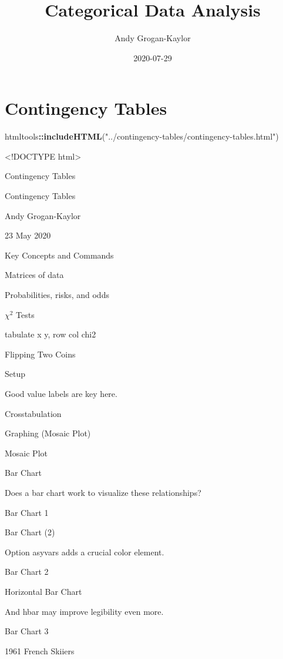 \documentclass[
]{article}
\title{Categorical Data Analysis}
\author{Andy Grogan-Kaylor}
\date{2020-07-29}
\newenvironment{Shaded}{\begin{snugshade}}{\end{snugshade}}
\newcommand{\KeywordTok}[1]{\textcolor[rgb]{0.13,0.29,0.53}{\textbf{#1}}}
\newcommand{\NormalTok}[1]{#1}
\newcommand{\OperatorTok}[1]{\textcolor[rgb]{0.81,0.36,0.00}{\textbf{#1}}}
\newcommand{\StringTok}[1]{\textcolor[rgb]{0.31,0.60,0.02}{#1}}
\begin{document}
\maketitle

{
\setcounter{tocdepth}{2}
\tableofcontents
}
\hypertarget{contingency-tables}{%
\section{Contingency Tables}\label{contingency-tables}}

\begin{Shaded}
\begin{Highlighting}[]
\NormalTok{htmltools}\OperatorTok{::}\KeywordTok{includeHTML}\NormalTok{(}\StringTok{"../contingency-tables/contingency-tables.html"}\NormalTok{)}
\end{Highlighting}
\end{Shaded}

\textless!DOCTYPE html\textgreater{}

Contingency Tables

Contingency Tables

Andy Grogan-Kaylor

23 May 2020

Key Concepts and Commands

Matrices of data

Probabilities, risks, and odds

{\(\chi^2\)} Tests

tabulate x y, row col chi2

Flipping Two Coins

Setup

Good value labels are key here.

Crosstabulation

Graphing (Mosaic Plot)

Mosaic Plot

Bar Chart

Does a bar chart work to visualize these relationships?

Bar Chart 1

Bar Chart (2)

Option asyvars adds a crucial color element.

Bar Chart 2

Horizontal Bar Chart

And hbar may improve legibility even more.

Bar Chart 3

1961 French Skiiers
\end{document}
